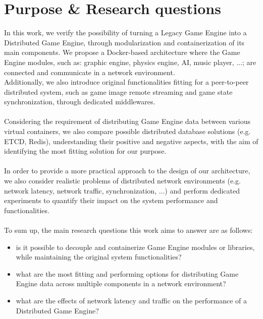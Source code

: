 \section{Purpose \& Research questions}
In this work, we verify the possibility of turning a Legacy Game Engine into a Distributed Game Engine, through modularization and containerization of its main components. We propose a Docker-based architecture where the Game Engine modules, such as: graphic engine, physics engine, AI, music player, ...; are connected and communicate in a network environment. \\
Additionally, we also introduce original functionalities fitting for a peer-to-peer distributed system, such as game image remote streaming and game state synchronization, through dedicated middlewares. \\ \\
Considering the requirement of distributing Game Engine data between various virtual containers, we also compare possible distributed database solutions (e.g. ETCD, Redis), understanding their positive and negative aspects, with the aim of identifying the most fitting solution for our purpose. \\ \\
In order to provide a more practical approach to the design of our architecture, we also consider realistic problems of distributed network environments (e.g. network latency, network traffic, synchronization, ...) and perform dedicated experiments to quantify their impact on the system performance and functionalities. \\ \\
To sum up, the main research questions this work aims to answer are as follows:
\begin{itemize}
	\item is it possible to decouple and containerize Game Engine modules or libraries, while maintaining the original system functionalities?
	\item what are the most fitting and performing options for distributing Game Engine data across multiple components in a network environment?
	\item what are the effects of network latency and traffic on the performance of a Distributed Game Engine?
\end{itemize}